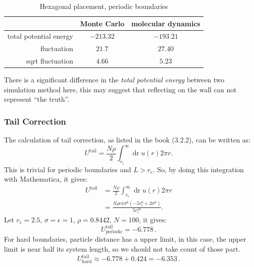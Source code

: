 \documentclass[UTF8,a4paper]{article}
\begin{document}
\begin{table}[H]
	\centering
	\caption{Hexagonal placement, periodic boundaries}
	\begin{tabular}{rcc}
		\toprule
		\toprule
		                       & Monte Carlo & molecular dynamics \\ \midrule
		total potential energy & $-213.32$   & $-193.21$          \\
		fluctuation            & $21.7$      & $27.40$            \\
		sqrt fluctuation       & $4.66$      & $5.23$             \\
		\bottomrule
	\end{tabular}%
	\label{tab:hex2}%
\end{table}%
There is a significant difference in the \textit{total potential energy} between two simulation method here, this may suggest that reflecting on the wall can not represent ``the truth''.

\subsubsection{Tail Correction}
The calculation of tail correction, as listed in the book (3.2.2), can be written as:
\begin{equation}
	U^{\text{tail}} = \frac{N \rho}{2} \int_{r_{c}}^{\infty} \operatorname{dr} u(r) 2 \pi r.
\end{equation}
This is trivial for periodic boundaries and $L>r_\text{c}$. So, by doing this integration with Mathematica, it gives:
\begin{equation}
	\begin{aligned}
		U^{\text{tail}} & = \frac{N \rho}{2} \int_{r_{c}}^{\infty} \operatorname{dr} u(r) 2 \pi r                            \\
		                & = \frac{N \rho \epsilon \pi \sigma^6\left(-5 r_\text{c}^6 + 2 \sigma^6\right)}{5 r_\text{c}^{10}}.
	\end{aligned}
	\label{eq:tail}
\end{equation}
Let $r_\text{c} = 2.5, \, \sigma = \epsilon = 1, \,\rho = 0.8442, \,N = 100$, it gives:
\begin{equation*}
	U^{\text{tail}}_{\text{periodic}} = -6.778\,.
\end{equation*}
For hard boundaries, particle distance has a upper limit, in this case, the upper limit is near half its system length, so we should not take count of those part.
\begin{equation*}
	U^{\text{tail}}_{\text{hard}} \approx -6.778 + 0.424 = -6.353 \,.
\end{equation*}
\end{document}
